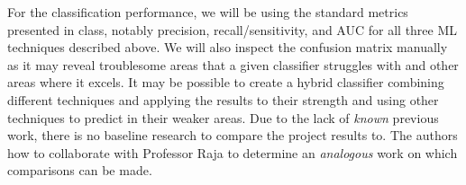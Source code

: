 \documentclass[12pt]{diazessay}
\begin{document}
For the classification performance, we will be using the standard metrics presented in class, notably precision, recall/sensitivity, and AUC for all three ML techniques described above.
We will also inspect the confusion matrix manually as it may reveal troublesome areas that a given classifier struggles with and other areas where it excels.
It may be possible to create a hybrid classifier combining different techniques and applying the results to their strength and using other techniques to predict in their weaker areas.
Due to the lack of \emph{known} previous work, there is no baseline research to compare the project results to.
The authors how to collaborate with Professor Raja to determine an \emph{analogous} work on which comparisons can be made.

\clearpage



\end{document}
